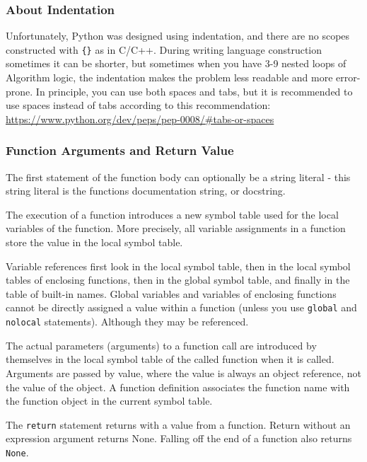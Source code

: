 \documentclass[
]{article}
\begin{document}
\hypertarget{about-indentation}{%
\subsubsection{About Indentation}\label{about-indentation}}

Unfortunately, Python was designed using indentation, and there are no
scopes constructed with \texttt{\{\}} as in C/C++. During writing
language construction sometimes it can be shorter, but sometimes when
you have 3-9 nested loops of Algorithm logic, the indentation makes the
problem less readable and more error-prone. In principle, you can use
both spaces and tabs, but it is recommended to use spaces instead of
tabs according to this recommendation:\\
\url{https://www.python.org/dev/peps/pep-0008/\#tabs-or-spaces}

\hypertarget{function-arguments-and-return-value}{%
\subsubsection{Function Arguments and Return
Value}\label{function-arguments-and-return-value}}

The first statement of the function body can optionally be a string
literal - this string literal is the functions documentation string, or
docstring.

The execution of a function introduces a new symbol table used for the
local variables of the function. More precisely, all variable
assignments in a function store the value in the local symbol table.

Variable references first look in the local symbol table, then in the
local symbol tables of enclosing functions, then in the global symbol
table, and finally in the table of built-in names. Global variables and
variables of enclosing functions cannot be directly assigned a value
within a function (unless you use \texttt{global} and \texttt{nolocal}
statements). Although they may be referenced.

The actual parameters (arguments) to a function call are introduced by
themselves in the local symbol table of the called function when it is
called. Arguments are passed by value, where the value is always an
object reference, not the value of the object. A function definition
associates the function name with the function object in the current
symbol table.

The \texttt{return} statement returns with a value from a function.
Return without an expression argument returns None. Falling off the end
of a function also returns \texttt{None}.
\end{document}
